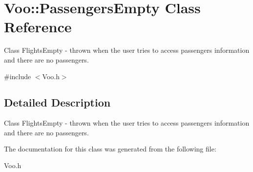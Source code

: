 \hypertarget{class_voo_1_1_passengers_empty}{}\section{Voo\+:\+:Passengers\+Empty Class Reference}
\label{class_voo_1_1_passengers_empty}


Class Flights\+Empty -\/ thrown when the user tries to access passengers information and there are no passengers.  




{\ttfamily \#include $<$Voo.\+h$>$}



\subsection{Detailed Description}
Class Flights\+Empty -\/ thrown when the user tries to access passengers information and there are no passengers. 

The documentation for this class was generated from the following file\+:\begin{DoxyCompactItemize}
\item 
Voo.\+h\end{DoxyCompactItemize}
